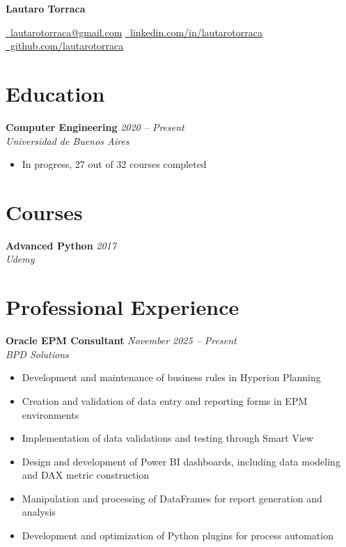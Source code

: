 \documentclass[10pt,a4paper]{article}
\newcommand{\cventry}[3]{%
  \textbf{#1} \hfill \textit{#3}\\[3pt]
  \textit{#2}%
}
\begin{document}
\begin{center}
  {\LARGE\bfseries Lautaro Torraca}

  \vspace{0.25cm}

  \href{mailto:lautarotorraca@gmail.com}
    {\faEnvelope\ lautarotorraca@gmail.com}
  \quad\textperiodcentered\quad
  \href{https://linkedin.com/in/lautarotorraca}
    {\faLinkedin\ linkedin.com/in/lautarotorraca}
  \quad\textperiodcentered\quad
  \href{https://github.com/lautarotorraca}
    {\faGithub\ github.com/lautarotorraca}
\end{center}

\section*{Education}

\cventry{Computer Engineering}{Universidad de Buenos Aires}{2020 -- Present}
\begin{itemize}[leftmargin=*, noitemsep, topsep=3pt, itemsep=2pt]
  \item In progress, 27 out of 32 courses completed
\end{itemize}

\section*{Courses}

\cventry{Advanced Python}{Udemy}{2017}

\section*{Professional Experience}

\cventry{Oracle EPM Consultant}{BPD Solutions}{November 2025 -- Present}
\begin{itemize}[leftmargin=*, noitemsep, topsep=3pt, itemsep=2pt]
  \item Development and maintenance of business rules in Hyperion Planning
  \item Creation and validation of data entry and reporting forms in EPM
        environments
  \item Implementation of data validations and testing through Smart View
  \item Design and development of Power BI dashboards, including data modeling
        and DAX metric construction
  \item Manipulation and processing of DataFrames for report generation and
        analysis
  \item Development and optimization of Python plugins for process automation
\end{itemize}
\end{document}
